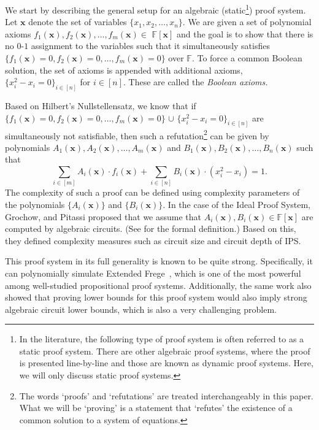 \documentclass[11pt]{article}
\newcommand{\xbar}{\mathbf{x}}
\begin{document}
We start by describing the general setup for an algebraic (static\footnote{In the literature, the following type of proof system is often referred to as a static proof system. There are other algebraic proof systems, where the proof is presented line-by-line and those are known as dynamic proof systems. Here, we will only discuss static proof systems.}) proof system. Let $\xbar$ denote the set of variables $\{x_1, x_2, \ldots, x_n\}$. We are given a set of polynomial axioms $f_1(\mathbf{x}), f_2(\mathbf{x}), \ldots, f_m(\mathbf{x}) \in$ $\mathbb{F}[\mathbf{x}]$ and the goal is to show that there is no $0$-$1$ assignment to the variables such that it simultaneously satisfies $\{f_1(\mathbf{x}) = 0, f_2(\mathbf{x}) = 0, \ldots, f_m(\mathbf{x}) = 0\}$ over $\mathbb{F}$. To force a common Boolean solution, the set of axioms is appended with additional axioms, $\{x_i^2 - x_i =0\}_{i \in [n]}$ for $i \in [n]$. These are called the \emph{Boolean axioms.} 

Based on Hilbert's Nullstellensatz, we know that if $\{f_1(\mathbf{x}) = 0, f_2(\mathbf{x}) = 0, \ldots, f_m(\mathbf{x}) = 0\}$ $\cup$ $\{x_i^2 - x_i=0\}_{i \in [n]}$ are simultaneously not satisfiable, then such a refutation\footnote{The words `proofs' and `refutations' are treated interchangeably in this paper. What we will be `proving' is a statement that `refutes' the existence of a common solution to a system of equations.} can be given by polynomials $A_1(\mathbf{x}), A_2(\mathbf{x}), \ldots, A_m(\mathbf{x})$ and $B_1(\mathbf{x}), B_2(\mathbf{x}), \ldots, B_n(\mathbf{x})$ such that
\begin{equation}
    \sum_{i \in [m]} A_i(\mathbf{x}) \cdot f_i(\mathbf{x}) +  \sum_{i \in [n]} B_i(\mathbf{x}) \cdot (x_i^2 - x_i) = 1.
\end{equation}
The complexity of such a proof can be defined using complexity parameters of the polynomials $\{A_i(\xbar)\}$ and $\{B_i(\xbar)\}$. 
In the case of the Ideal Proof System, Grochow, and Pitassi proposed that we assume that $A_i(\xbar), B_i(\xbar) \in \mathbb{F}[\xbar]$ are computed by algebraic circuits. (See  for the formal definition.) Based on this, they defined complexity measures such as circuit size and circuit depth of IPS. 

This proof system in its full generality is known to be quite strong. Specifically, it can polynomially simulate Extended Frege~\cite{GP14}, which is one of the most powerful among well-studied propositional proof systems. Additionally, the same work also showed that proving lower bounds for this proof system would also imply strong algebraic circuit lower bounds, which is also a very challenging problem. 
\end{document}
